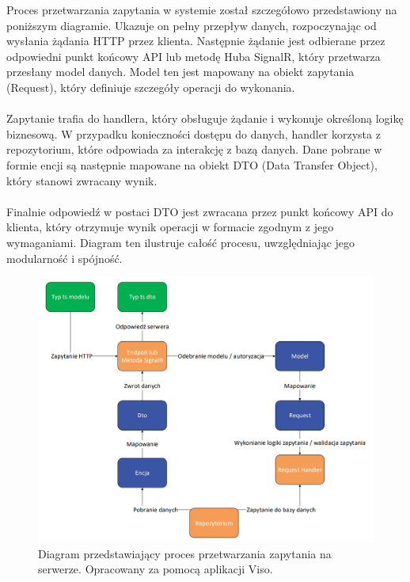 \documentclass[12pt,a4paper]{article}
\begin{document}
\noindent
Proces przetwarzania zapytania w systemie został szczegółowo przedstawiony na poniższym diagramie. Ukazuje on pełny przepływ danych, rozpoczynając od wysłania żądania HTTP przez klienta. Następnie żądanie jest odbierane przez odpowiedni punkt końcowy API lub metodę Huba SignalR, który przetwarza przesłany model danych. Model ten jest mapowany na obiekt zapytania (Request), który definiuje szczegóły operacji do wykonania.
\\\\
Zapytanie trafia do handlera, który obsługuje żądanie i wykonuje określoną logikę biznesową. W przypadku konieczności dostępu do danych, handler korzysta z repozytorium, które odpowiada za interakcję z bazą danych. Dane pobrane w formie encji są następnie mapowane na obiekt DTO (Data Transfer Object), który stanowi zwracany wynik. 
\\\\
Finalnie odpowiedź w postaci DTO jest zwracana przez punkt końcowy API do klienta, który otrzymuje wynik operacji w formacie zgodnym z jego wymaganiami. Diagram ten ilustruje całość procesu, uwzględniając jego modularność i spójność.

\vspace{1cm}
\begin{figure}[h!]
    \centering
    \includegraphics[width=1\textwidth]{images/diagram_back.png}
    \caption{Diagram przedstawiający proces przetwarzania zapytania na serwerze. Opracowany za pomocą aplikacji Viso.}
\end{figure}

\newpage
\end{document}
